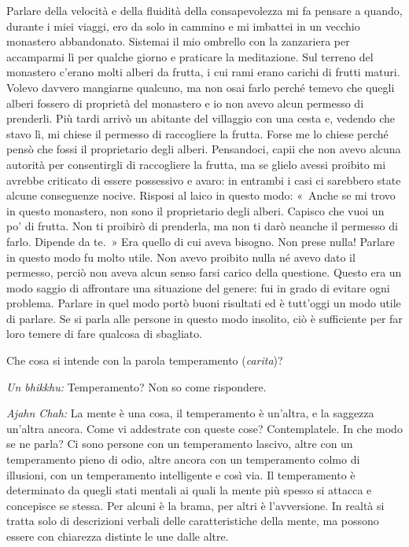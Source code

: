 Parlare della velocità e della fluidità della consapevolezza mi fa
pensare a quando, durante i miei viaggi, ero da solo in cammino e mi
imbattei in un vecchio monastero abbandonato. Sistemai il mio ombrello
con la zanzariera per accamparmi lì per qualche giorno e praticare la
meditazione. Sul terreno del monastero c'erano molti alberi da frutta, i
cui rami erano carichi di frutti maturi. Volevo davvero mangiarne
qualcuno, ma non osai farlo perché temevo che quegli alberi fossero di
proprietà del monastero e io non avevo alcun permesso di prenderli. Più
tardi arrivò un abitante del villaggio con una cesta e, vedendo che
stavo lì, mi chiese il permesso di raccogliere la frutta. Forse me lo
chiese perché pensò che fossi il proprietario degli alberi. Pensandoci,
capii che non avevo alcuna autorità per consentirgli di raccogliere la
frutta, ma se glielo avessi proibito mi avrebbe criticato di essere
possessivo e avaro: in entrambi i casi ci sarebbero state alcune
conseguenze nocive. Risposi al laico in questo modo: «~Anche se mi trovo
in questo monastero, non sono il proprietario degli alberi. Capisco che
vuoi un po' di frutta. Non ti proibirò di prenderla, ma non ti darò
neanche il permesso di farlo. Dipende da te.~» Era quello di cui aveva
bisogno. Non prese nulla! Parlare in questo modo fu molto utile. Non
avevo proibito nulla né avevo dato il permesso, perciò non aveva alcun
senso farsi carico della questione. Questo era un modo saggio di
affrontare una situazione del genere: fui in grado di evitare ogni
problema. Parlare in quel modo portò buoni risultati ed è tutt'oggi un
modo utile di parlare. Se si parla alle persone in questo modo insolito,
ciò è sufficiente per far loro temere di fare qualcosa di sbagliato.

Che cosa si intende con la parola temperamento (\emph{carita})?

\emph{Un bhikkhu:} Temperamento? Non so come rispondere.

\emph{Ajahn Chah:} La mente è una cosa, il temperamento è un'altra, e la
saggezza un'altra ancora. Come vi addestrate con queste cose?
Contemplatele. In che modo se ne parla? Ci sono persone con un
temperamento lascivo, altre con un temperamento pieno di odio, altre
ancora con un temperamento colmo di illusioni, con un temperamento
intelligente e così via. Il temperamento è determinato da quegli stati
mentali ai quali la mente più spesso si attacca e concepisce se stessa.
Per alcuni è la brama, per altri è l'avversione. In realtà si tratta
solo di descrizioni verbali delle caratteristiche della mente, ma
possono essere con chiarezza distinte le une dalle altre.

